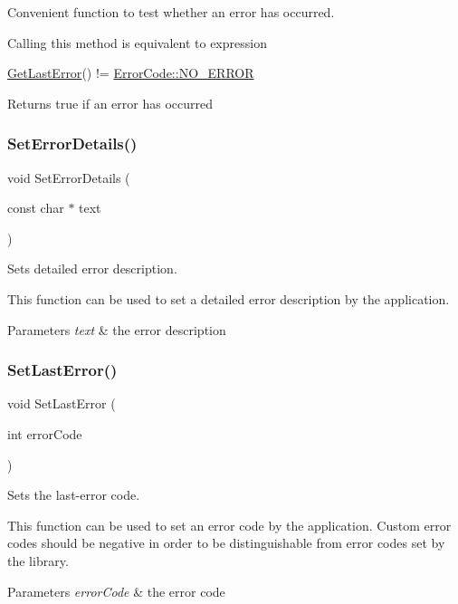 Convenient function to test whether an error has occurred.

Calling this method is equivalent to expression


\begin{DoxyCode}
\hyperlink{group__error__group_ga10b9a284527af83a44533867b0aff0fc}{GetLastError}() != \hyperlink{group__error__group_gga59e56af19e754a6aa26a612ebf91d05fabf350750d0d4fabd8954c0f1e9bbae94}{ErrorCode::NO\_ERROR}
\end{DoxyCode}


\begin{DoxyReturn}{Returns}
{\ttfamily true} if an error has occurred 
\end{DoxyReturn}
\mbox{\label{group__error__group_gac4c413604bb98cf7bb6befe53e748b63}} 
\subsubsection{\texorpdfstring{Set\+Error\+Details()}{SetErrorDetails()}}
{\footnotesize\ttfamily void Set\+Error\+Details (\begin{DoxyParamCaption}\item[{const char $\ast$}]{text }\end{DoxyParamCaption})}

Sets detailed error description.

This function can be used to set a detailed error description by the application.


\begin{DoxyParams}{Parameters}
{\em text} & the error description \\
\hline
\end{DoxyParams}
\mbox{\label{group__error__group_ga042670233cf17b3bfb1412a37e7dfd59}} 
\subsubsection{\texorpdfstring{Set\+Last\+Error()}{SetLastError()}}
{\footnotesize\ttfamily void Set\+Last\+Error (\begin{DoxyParamCaption}\item[{int}]{error\+Code }\end{DoxyParamCaption})}

Sets the last-\/error code.

This function can be used to set an error code by the application. Custom error codes should be negative in order to be distinguishable from error codes set by the library.


\begin{DoxyParams}{Parameters}
{\em error\+Code} & the error code \\
\hline
\end{DoxyParams}
